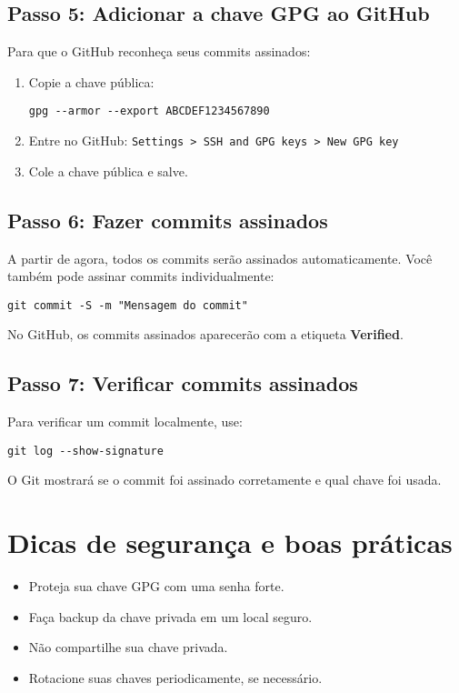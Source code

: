 \subsection{Passo 5: Adicionar a chave GPG ao GitHub}
Para que o GitHub reconheça seus commits assinados:
\begin{enumerate}
    \item Copie a chave pública:
    \begin{verbatim}
gpg --armor --export ABCDEF1234567890
    \end{verbatim}
    \item Entre no GitHub: \texttt{Settings > SSH and GPG keys > New GPG key}
    \item Cole a chave pública e salve.
\end{enumerate}

\subsection{Passo 6: Fazer commits assinados}
A partir de agora, todos os commits serão assinados automaticamente. Você também pode assinar commits individualmente:

\begin{verbatim}
git commit -S -m "Mensagem do commit"
\end{verbatim}

No GitHub, os commits assinados aparecerão com a etiqueta \textbf{Verified}.

\subsection{Passo 7: Verificar commits assinados}
Para verificar um commit localmente, use:

\begin{verbatim}
git log --show-signature
\end{verbatim}

O Git mostrará se o commit foi assinado corretamente e qual chave foi usada.

\section{Dicas de segurança e boas práticas}
\begin{itemize}
    \item Proteja sua chave GPG com uma senha forte.
    \item Faça backup da chave privada em um local seguro.
    \item Não compartilhe sua chave privada.
    \item Rotacione suas chaves periodicamente, se necessário.
\end{itemize}
